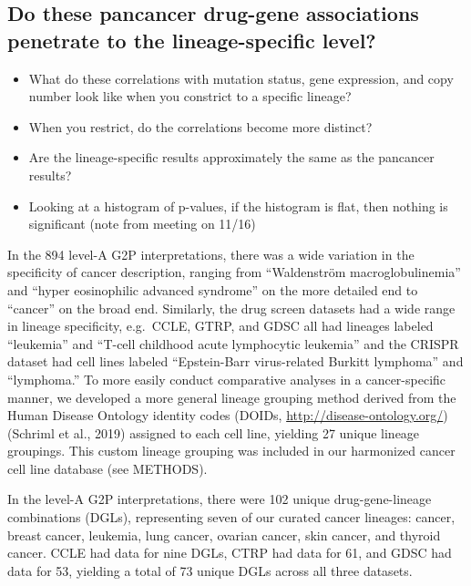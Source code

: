 \documentclass[man]{apa6}
\providecommand{\tightlist}{%
  \setlength{\itemsep}{0pt}\setlength{\parskip}{0pt}}
\begin{document}
\subsection{Do these pancancer drug-gene associations penetrate to the
lineage-specific
level?}\label{do-these-pancancer-drug-gene-associations-penetrate-to-the-lineage-specific-level}

\begin{itemize}
\tightlist
\item
  What do these correlations with mutation status, gene expression, and
  copy number look like when you constrict to a specific lineage?
\item
  When you restrict, do the correlations become more distinct?
\item
  Are the lineage-specific results approximately the same as the
  pancancer results?
\item
  Looking at a histogram of p-values, if the histogram is flat, then
  nothing is significant (note from meeting on 11/16)
\end{itemize}

In the 894 level-A G2P interpretations, there was a wide variation in
the specificity of cancer description, ranging from \enquote{Waldenström
macroglobulinemia} and \enquote{hyper eosinophilic advanced syndrome} on
the more detailed end to \enquote{cancer} on the broad end. Similarly,
the drug screen datasets had a wide range in lineage specificity,
e.g.~CCLE, GTRP, and GDSC all had lineages labeled \enquote{leukemia}
and \enquote{T-cell childhood acute lymphocytic leukemia} and the CRISPR
dataset had cell lines labeled \enquote{Epstein-Barr virus-related
Burkitt lymphoma} and \enquote{lymphoma.} To more easily conduct
comparative analyses in a cancer-specific manner, we developed a more
general lineage grouping method derived from the Human Disease Ontology
identity codes (DOIDs, \url{http://disease-ontology.org/}) (Schriml et
al., 2019) assigned to each cell line, yielding 27 unique lineage
groupings. This custom lineage grouping was included in our harmonized
cancer cell line database (see METHODS).

In the level-A G2P interpretations, there were 102 unique
drug-gene-lineage combinations (DGLs), representing seven of our curated
cancer lineages: cancer, breast cancer, leukemia, lung cancer, ovarian
cancer, skin cancer, and thyroid cancer. CCLE had data for nine DGLs,
CTRP had data for 61, and GDSC had data for 53, yielding a total of 73
unique DGLs across all three datasets.
\end{document}

